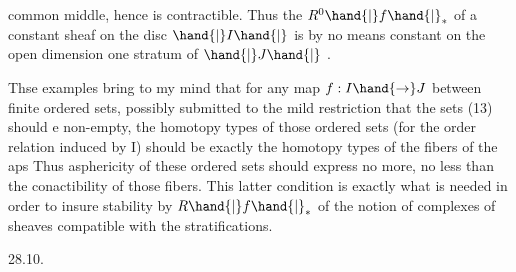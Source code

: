 common middle, hence is contractible. Thus the $R^{0}\hand{|}f\hand{|}_{*}$ of a constant
sheaf on the disc $\hand{|}I\hand{|}$ is by no means constant on the open\hand{,} dimension one
stratum of $\hand{|}J\hand{|}$ .

Thse examples bring to my mind that for any map $f: I \hand{\to} J$ between
finite ordered sets,  possibly submitted to the mild
restriction that the sets (13) should e non-empty, the homotopy types
of those  ordered sets  (for the order relation induced by I) should
be exactly the homotopy types of the fibers of the aps  
Thus asphericity of these ordered sets should express no more, no less
than the conactibility of those fibers.\deleted{(} This latter condition is
exactly what is needed in order to insure stability by $R\hand{|}f\hand{|}_{*}$ of the
notion of complexes of sheaves compatible with the stratifications.

28.10.

